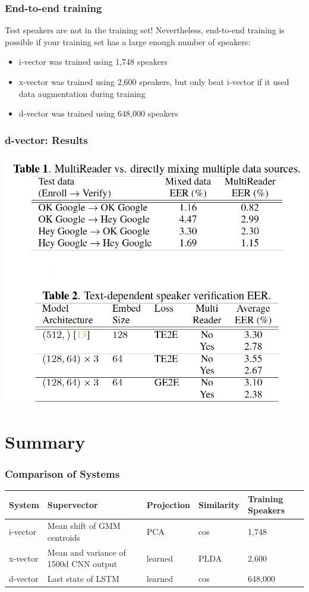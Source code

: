 \documentclass{beamer}
\begin{document}
\begin{frame}
  \frametitle{End-to-end training}

  Test speakers are not in the training set!  Nevertheless, end-to-end
  training is possible if your training set has a large enough number
  of speakers:
  \begin{itemize}
  \item i-vector was trained using 1,748 speakers
  \item x-vector was trained using 2,600 speakers, but only beat
    i-vector if it used data augmentation during training
  \item d-vector was trained using 648,000 speakers
  \end{itemize}
\end{frame}

\begin{frame}
  \frametitle{d-vector: Results}
  
  \centerline{\includegraphics[height=0.8\textheight]{figs/wan2018table1.png}}
\end{frame}

  
\section{Summary}
\setcounter{subsection}{1}


\begin{frame}
  \frametitle{Comparison of Systems}

  \begin{center}
    \begin{tabular}{|p{15mm}|p{30mm}|p{16mm}|p{13mm}|p{13mm}|}\hline
      System & Supervector & Projection & Similarity & Training Speakers\\\hline
      i-vector & Mean shift of GMM centroids & PCA & cos & 1,748\\
      x-vector & Mean and variance of 1500d CNN output & learned & PLDA & 2,600\\
      d-vector & Last state of LSTM & learned & cos & 648,000\\\hline
    \end{tabular}
  \end{center}
\end{frame}
\end{document}

